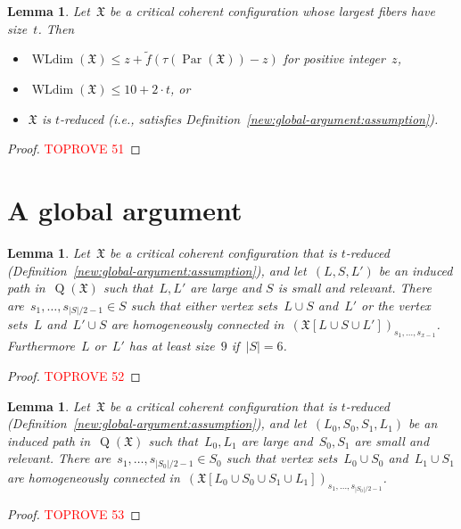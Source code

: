 \documentclass[english,a4paper]{article}
\theoremstyle{plain}
\newtheorem{lemma}      [theorem]{Lemma}
\theoremstyle{definition}
\newcommand{\coherentConfig}{\ensuremath{\mathfrak{X}}}
\DeclareMathOperator*{\WLdim}{WLdim}
\newcommand{\wldim}[1]{\ensuremath{\WLdim\left(#1\right)}}
\DeclareMathOperator*{\Quotient}{Q}
\newcommand{\quotientGraph}[1]{\ensuremath{\Quotient(#1)}}
\newcommand{\f}{f}
\DeclareMathOperator{\parameters}{Par}
\begin{document}
\begin{lemma}\label{lem:properties:or:t:reduced}
    Let~$\coherentConfig$ be a critical coherent configuration whose largest fibers have size~$t$.
    Then
    \begin{itemize}
        \item $\wldim{\coherentConfig} \leq z + \widetilde{\f}( \tau(\parameters(\coherentConfig)) - z)$ for positive integer~$z$,
        \item $\wldim{\coherentConfig} \leq 10 + 2\cdot t$, or
        \item $\coherentConfig$ is $t$-reduced (i.e., satisfies Definition~\ref{new:global-argument:assumption}).
    \end{itemize}
\end{lemma}
\begin{proof}\textcolor{red}{TOPROVE 51}\end{proof}
     

\section{A global argument}
\label{global-argument/sec}

\begin{lemma}
\label{global-argument:LSL/lem}
    Let~$\coherentConfig$ be a critical coherent configuration that is $t$-reduced (Definition~\ref{new:global-argument:assumption}), and let~$(L,S,L')$ be an induced path in~$\quotientGraph{\coherentConfig}$ such that~$L, L'$ are large and $S$ is small and relevant.
    There are~$s_{1},\dots,s_{|S|/2 -1} \in S$ such that either vertex sets~$L \cup S$ and~$L'$ or the vertex sets~$L$ and~$L' \cup S$ are homogeneously connected in~$(\coherentConfig[L \cup S \cup L'])_{s_1,\dots,s_{x-1}}$.
    Furthermore~$L$ or~$L'$ has at least size~$9$ if~$|S| = 6$.
\end{lemma}
\begin{proof}\textcolor{red}{TOPROVE 52}\end{proof}



\begin{lemma}
\label{global-argument:LSSL/lem}
    Let~$\coherentConfig$ be a critical coherent configuration that is $t$-reduced (Definition~\ref{new:global-argument:assumption}), and let~$(L_0 ,S_0 ,S_1, L_1)$ be an induced path in~$\quotientGraph{\coherentConfig}$ such that~$L_0, L_1$ are large and~$S_0, S_1$ are small and relevant.
    There are~$s_{1},\dots,s_{|S_0|/2 -1} \in S_0$ such that vertex sets~$L_0 \cup S_0$ and~$L_1 \cup S_1$ are homogeneously connected in~$(\coherentConfig[L_0 \cup S_0 \cup S_1 \cup L_1])_{s_1,\dots,s_{|S_0|/2-1}}$.
\end{lemma}
\begin{proof}\textcolor{red}{TOPROVE 53}\end{proof}
\end{document}
